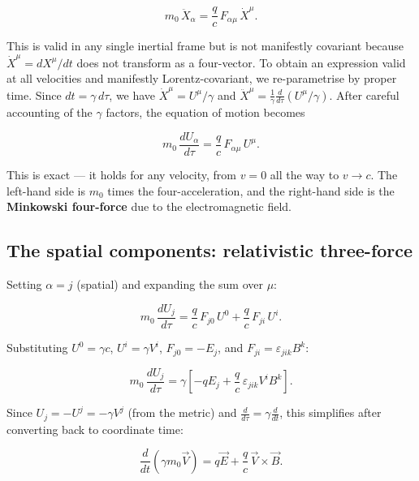 \begin{equation}
m_0\,\ddot{X}_\alpha = \frac{q}{c}\,F_{\alpha\mu}\,\dot{X}^\mu.
\end{equation}

This is valid in any single inertial frame but is not manifestly covariant because $\dot{X}^\mu = dX^\mu/dt$ does not transform as a four-vector. To obtain an expression valid at all velocities and manifestly Lorentz-covariant, we re-parametrise by proper time. Since $dt = \gamma\,d\tau$, we have $\dot{X}^\mu = U^\mu/\gamma$ and $\ddot{X}^\mu = \frac{1}{\gamma}\frac{d}{d\tau}(U^\mu/\gamma)$. After careful accounting of the $\gamma$ factors, the equation of motion becomes

\begin{equation}
\boxed{m_0\,\frac{dU_\alpha}{d\tau} = \frac{q}{c}\,F_{\alpha\mu}\,U^\mu.}
\end{equation}

This is exact --- it holds for any velocity, from $v = 0$ all the way to $v \to c$. The left-hand side is $m_0$ times the four-acceleration, and the right-hand side is the \textbf{Minkowski four-force} due to the electromagnetic field.

\subsection*{The spatial components: relativistic three-force}

Setting $\alpha = j$ (spatial) and expanding the sum over $\mu$:

\begin{equation}
m_0\,\frac{dU_j}{d\tau} = \frac{q}{c}\,F_{j0}\,U^0 + \frac{q}{c}\,F_{ji}\,U^i.
\end{equation}

Substituting $U^0 = \gamma c$, $U^i = \gamma V^i$, $F_{j0} = -E_j$, and $F_{ji} = \varepsilon_{jik}B^k$:

\begin{equation}
m_0\,\frac{dU_j}{d\tau} = \gamma\!\left[-qE_j + \frac{q}{c}\,\varepsilon_{jik}V^i B^k\right].
\end{equation}

Since $U_j = -U^j = -\gamma V^j$ (from the metric) and $\frac{d}{d\tau} = \gamma\frac{d}{dt}$, this simplifies after converting back to coordinate time:

\begin{equation}
\frac{d}{dt}\!\left(\gamma m_0 \vec{V}\right) = q\vec{E} + \frac{q}{c}\,\vec{V}\times\vec{B}.
\end{equation}

